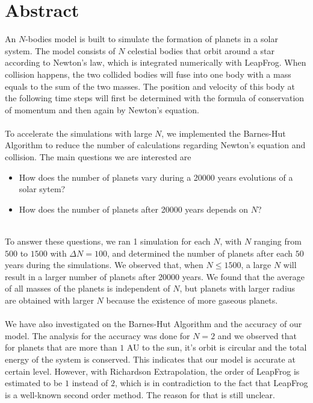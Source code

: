 \section*{Abstract}
An $N$-bodies model is built to simulate the formation of planets in a solar system. The model consists of $N$ celestial bodies that orbit around a star according to Newton's law, which is integrated numerically with LeapFrog. When collision happens, the two collided bodies will fuse into one body with a mass equals to the sum of the two masses. The position and velocity of this body at the following time steps will first be determined with the formula of conservation of momentum and then again by Newton's equation.\\
\\
To accelerate the simulations with large $N$, we implemented the Barnes-Hut Algorithm to reduce the number of calculations regarding Newton's equation and collision. The main questions we are interested are
\begin{itemize}
\item How does the number of planets vary during a 20000 years evolutions of a solar sytem?

\item How does the number of planets after 20000 years depends on $N$?
\end{itemize}
\leavevmode
\\
To answer these questions, we ran 1 simulation for each $N$, with $N$ ranging from $500$ to $1500$ with $\Delta N=100$, and determined the number of planets after each $50$ years during the simulations. We observed that, when $N\leq 1500$, a large $N$ will result in a larger number of planets after 20000 years. We found that the average of all masses of the planets is independent of $N$, but planets with larger radius are obtained with larger $N$ because the existence of more gaseous planets.\\
\\
We have also investigated on the Barnes-Hut Algorithm and the accuracy of our model. The analysis for the accuracy was done for $N=2$ and we observed that for planets that are more than $1$ AU to the sun, it's orbit is circular and the total energy of the system is conserved. This indicates that our model is accurate at certain level. However, with Richardson Extrapolation, the order of LeapFrog is estimated to be $1$ instead of $2$, which is in contradiction to the fact that LeapFrog is a well-known second order method. The reason for that is still unclear.